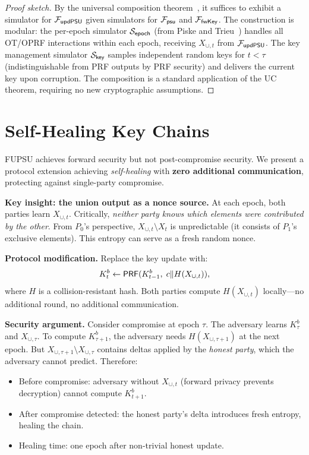\begin{proof}[Proof sketch]
By the universal composition theorem~\cite{Can01}, it suffices to exhibit a
simulator for $\mathcal{F}_{\mathsf{updPSU}}$ given simulators for $\mathcal{F}_{\mathsf{psu}}$
and $\mathcal{F}_{\mathsf{fwKey}}$. The construction is modular: the per-epoch
simulator $\mathcal{S}_{\mathsf{epoch}}$ (from Piske and Trieu~\cite{PT26}) handles
all OT/OPRF interactions within each epoch, receiving $X_{\cup,t}$ from
$\mathcal{F}_{\mathsf{updPSU}}$. The key management simulator $\mathcal{S}_{\mathsf{key}}$
samples independent random keys for $t < \tau$ (indistinguishable from PRF
outputs by PRF security) and delivers the current key upon corruption. The
composition is a standard application of the UC theorem, requiring no new
cryptographic assumptions.
\end{proof}

\section{Self-Healing Key Chains}
\label{sec:selfheal}

FUPSU achieves forward security but not post-compromise security. We present
a protocol extension achieving \emph{self-healing} with \textbf{zero additional
communication}, protecting against single-party compromise.

\textbf{Key insight: the union output as a nonce source.}
At each epoch, both parties learn $X_{\cup,t}$. Critically, \emph{neither
party knows which elements were contributed by the other}. From $P_0$'s
perspective, $X_{\cup,t} \setminus X_t$ is unpredictable (it consists of
$P_1$'s exclusive elements). This entropy can serve as a fresh random nonce.

\textbf{Protocol modification.}
Replace the key update with:
\[
K^b_t \leftarrow \mathsf{PRF}(K^b_{t-1},\; c \| H(X_{\cup,t})),
\]
where $H$ is a collision-resistant hash. Both parties compute $H(X_{\cup,t})$
locally---no additional round, no additional communication.

\textbf{Security argument.}
Consider compromise at epoch $\tau$. The adversary learns $K^b_\tau$ and
$X_{\cup,\tau}$. To compute $K^b_{\tau+1}$, the adversary needs
$H(X_{\cup,\tau+1})$ at the next epoch. But $X_{\cup,\tau+1} \setminus
X_{\cup,\tau}$ contains deltas applied by the \emph{honest party}, which the
adversary cannot predict. Therefore:
\begin{itemize}
\item Before compromise: adversary without $X_{\cup,t}$ (forward privacy
prevents decryption) cannot compute $K^b_{t+1}$.
\item After compromise detected: the honest party's delta introduces fresh
entropy, healing the chain.
\item Healing time: one epoch after non-trivial honest update.
\end{itemize}

